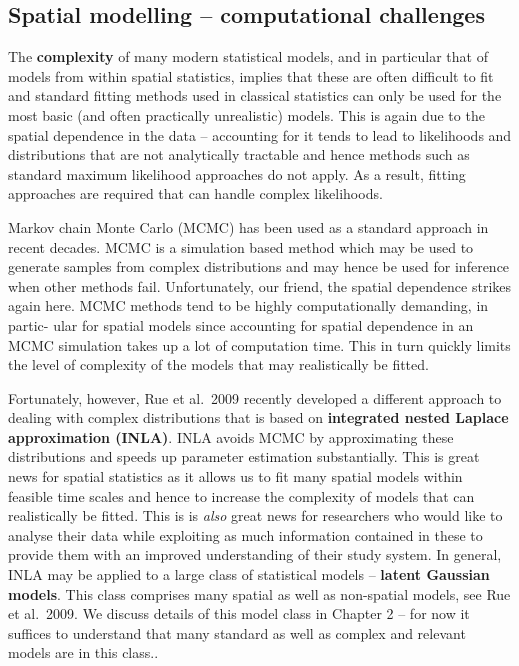 \subsection{Spatial modelling -- computational challenges }

The \textbf{complexity} of many modern statistical models, and in particular that of models from within spatial statistics, implies that these are often difficult to fit and standard fitting methods used in classical statistics can only be used for the most basic (and often practically unrealistic) models. This is again due to the spatial dependence in the data  -- accounting for it tends to lead to likelihoods and distributions that are not analytically tractable and hence methods such as standard maximum likelihood approaches do not apply. As a result, fitting approaches are required that can handle complex likelihoods. 

Markov chain Monte Carlo (MCMC) has been used as a standard approach in recent decades. MCMC is a simulation based method which may be used to generate samples from complex distributions and may hence be used for inference when other methods fail. Unfortunately, our friend, the spatial dependence strikes again here. MCMC methods tend to be highly computationally demanding, in partic- ular for spatial models since accounting for spatial dependence in an MCMC simulation takes up a lot of computation time. This in turn quickly limits the level of complexity of the models that may realistically be fitted.

Fortunately, however, Rue et al.\ 2009 recently developed  a different approach to dealing with  complex distributions that is based on \textbf{integrated nested Laplace approximation (INLA)}. INLA  avoids MCMC by approximating these distributions  and speeds up parameter estimation substantially.
This is great news for spatial statistics as it allows us to fit many spatial models within feasible time scales and hence to increase the complexity of models that can realistically be fitted. This is is \textit{also} great news for researchers who would like to  analyse their data while exploiting as much information contained in these to provide them with an improved understanding of their study system.  In general, INLA may be applied to a large class of statistical models -- \textbf{latent Gaussian models}. This class comprises many spatial as well as non-spatial models, see Rue et al.\ 2009. We discuss details of this model class in Chapter 2 -- for now it suffices to understand that many standard as well as complex and relevant models are in this class.. 



